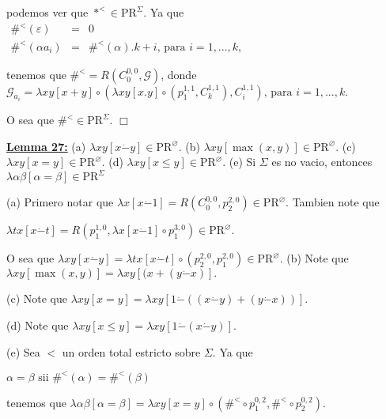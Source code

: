   podemos ver que \(\ast ^{< }\in \mathrm{PR}^{\Sigma }.\) Ya que
  \(\displaystyle \begin{array}{rcl} \#^{< }(\varepsilon ) & =& 0 \\ \#^{< }(\alpha a_{i}) & =& \#^{< }(\alpha ).k+i\text{, para }i=1,...,k, \end{array} \)

  tenemos que \(\#^{< }=R\left( C_{0}^{0,0},\mathcal{G}\right) \), donde
  \(\displaystyle \mathcal{G}_{a_{i}}=\lambda xy\left[ x+y\right] \circ \left( \lambda xy\left[ x.y\right] \circ \left( p_{1}^{1,1},C_{k}^{1,1}\right) ,C_{i}^{1,1}\right) \text{, para }i=1,...,k\text{.} \)

  O sea que \(\#^{< }\in \mathrm{PR}^{\Sigma }\). \(\Box\)

  \textbf{\underline{Lemma 27:}}
  (a) \(\lambda xy\left[ x\dot{-}y\right] \in \mathrm{PR}^{\varnothing }.\)
  (b) \(\lambda xy\left[ \max (x,y)\right] \in \mathrm{PR}^{\varnothing }.\)
  (c) \(\lambda xy\left[ x=y\right] \in \mathrm{PR}^{\varnothing }.\)
  (d) \(\lambda xy\left[ x\leq y\right] \in \mathrm{PR}^{\varnothing }.\)
  (e) Si \(\Sigma \) es no vacio, entonces \(\lambda \alpha \beta \left[ \alpha =\beta \right] \in \mathrm{PR}^{\Sigma }\)


  \PROOF (a) Primero notar que \(\lambda x\left[ x\dot{-}1\right] =R\left( C_{0}^{0,0},p_{2}^{2,0}\right) \in \mathrm{PR}^{\varnothing }.\) Tambien note que

  \(\displaystyle \lambda tx\left[ x\dot{-}t\right] =R\left( p_{1}^{1,0},\lambda x\left[ x\dot{ -}1\right] \circ p_{1}^{3,0}\right) \in \mathrm{PR}^{\varnothing }. \)

  O sea que \(\lambda xy\left[ x\dot{-}y\right] =\lambda tx\left[ x\dot{-}t \right] \circ \left( p_{2}^{2,0},p_{1}^{2,0}\right) \in \mathrm{PR} ^{\varnothing }.\)
  (b) Note que \(\lambda xy\left[ \max (x,y)\right] =\lambda xy\left[ (x+(y\dot{ -}x)\right] .\)

  (c) Note que \(\lambda xy\left[ x=y\right] =\lambda xy\left[ 1\dot{-}((x\dot{- }y)+(y\dot{-}x))\right] .\)

  (d) Note que \(\lambda xy\left[ x\leq y\right] =\lambda xy\left[ 1\dot{-}(x \dot{-}y)\right] .\)

  (e) Sea \(< \) un orden total estricto sobre \(\Sigma .\) Ya que

  \(\displaystyle \alpha =\beta \text{ sii }\#^{< }(\alpha )=\#^{< }(\beta ) \)

  tenemos que
  \(\displaystyle \lambda \alpha \beta \left[ \alpha =\beta \right] =\lambda xy\left[ x=y \right] \circ \left( \#^{< }\circ p_{1}^{0,2},\#^{< }\circ p_{2}^{0,2}\right) . \)

